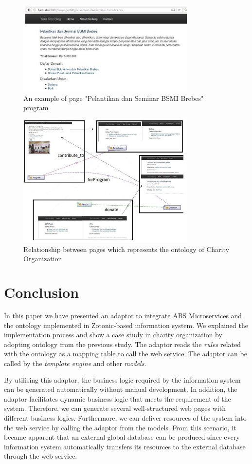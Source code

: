 \documentclass[conference]{IEEEtran}
\begin{document}
\begin{figure}[h]
	\centering
	\includegraphics[width=3.5in]{samplepage}
	
	\caption{An example of page "Pelantikan dan Seminar BSMI Brebes" program}
	\label{view_program}
\end{figure}

\begin{figure}[h]
	\centering
	\includegraphics[width=3.5in]{pagerelation}
	
	\caption{Relationship between pages which represents the ontology of Charity Organization}
	\label{view_program}
\end{figure}

\section{Conclusion} \label{conclusion}
In this paper we have presented an adaptor to integrate ABS Microservices and the ontology implemented in Zotonic-based information system. We explained the implementation process and show a case study in charity organization by adopting ontology from the previous study. The adaptor reads the \textit{rules} related with the ontology as a mapping table to call the web service. The adaptor can be called by the \textit{template engine} and other \textit{models}.

By utilising this adaptor, the business logic required by the information system can be generated automatically without manual development. In addition, the adaptor facilitates dynamic business logic that meets the requirement of the system. Therefore, we can generate several well-structured web pages with different business logics. Furthermore, we can deliver resources of the system into the web service by calling the adaptor from the models. From this scenario, it became apparent that an external global database can be produced since every information system automatically transfers its resources to the external database through the web service. 
\end{document}
